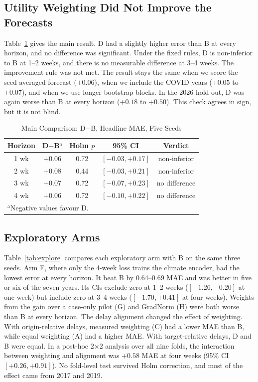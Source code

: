 \documentclass[conference]{IEEEtran}
\begin{document}
\subsection{Utility Weighting Did Not Improve the Forecasts}

Table~\ref{tab:primary} gives the main result. D had a slightly higher error than B at every horizon, and no difference was significant. Under the fixed rules, D is non-inferior to B at 1--2 weeks, and there is no measurable difference at 3--4 weeks. The improvement rule was not met. The result stays the same when we score the seed-averaged forecast ($+0.06$), when we include the COVID years ($+0.05$ to $+0.07$), and when we use longer bootstrap blocks. In the 2026 hold-out, D was again worse than B at every horizon ($+0.18$ to $+0.50$). This check agrees in sign, but it is not blind.

\begin{table}[htbp]
\caption{Main Comparison: D$-$B, Headline MAE, Five Seeds}
\begin{center}
\setlength{\tabcolsep}{3pt}
\begin{tabular}{|c|c|c|c|c|}
\hline
\textbf{Horizon} & \textbf{D$-$B}$^{\mathrm{a}}$ & \textbf{Holm $p$} & \textbf{95\% CI} & \textbf{Verdict} \\
\hline
1 wk & $+0.06$ & 0.72 & $[-0.03, +0.17]$ & non-inferior \\
2 wk & $+0.08$ & 0.44 & $[-0.03, +0.21]$ & non-inferior \\
3 wk & $+0.07$ & 0.72 & $[-0.07, +0.23]$ & no difference \\
4 wk & $+0.06$ & 0.72 & $[-0.10, +0.22]$ & no difference \\
\hline
\multicolumn{5}{l}{$^{\mathrm{a}}$Negative values favour D.}
\end{tabular}
\label{tab:primary}
\end{center}
\end{table}

\subsection{Exploratory Arms}

Table~\ref{tab:explore} compares each exploratory arm with B on the same three seeds. Arm F, where only the 4-week loss trains the climate encoder, had the lowest error at every horizon. It beat B by 0.64--0.69 MAE and was better in five or six of the seven years. Its CIs exclude zero at 1--2 weeks ($[-1.26, -0.20]$ at one week) but include zero at 3--4 weeks ($[-1.70, +0.41]$ at four weeks). Weights from the gain over a case-only pilot (G) and GradNorm (H) were both worse than B at every horizon. The delay alignment changed the effect of weighting. With origin-relative delays, measured weighting (C) had a lower MAE than B, while equal weighting (A) had a higher MAE. With target-relative delays, D and B were equal. In a post-hoc 2$\times$2 analysis over all nine folds, the interaction between weighting and alignment was $+0.58$ MAE at four weeks (95\% CI $[+0.26, +0.91]$). No fold-level test survived Holm correction, and most of the effect came from 2017 and 2019.
\end{document}
